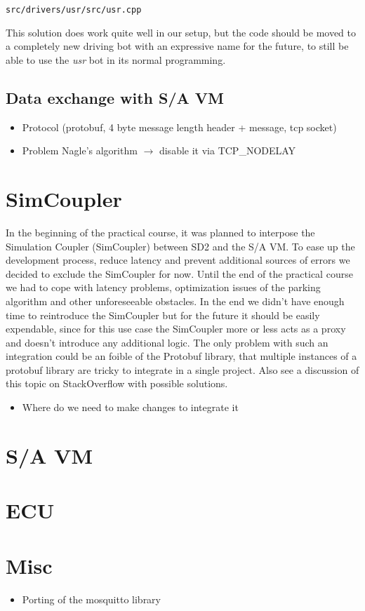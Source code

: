 \documentclass[paper=a4, fontsize=11pt]{scrreprt}
\begin{document}
\begin{listing}[ht]
  \inputminted[firstline=751,linenos=true,lastline=755,gobble=4]{c++}{../../../simulators/speed-dreams/src/drivers/usr/src/usr.cpp}
  \caption{\texttt{src/drivers/usr/src/usr.cpp}}\label{aw_parked}
\end{listing}

This solution does work quite well in our setup,
but the code should be moved to a completely new driving bot with an expressive name for the future,
to still be able to use the \textit{usr} bot in its normal programming.

\subsection{Data exchange with S/A VM}
\begin{itemize}
  \item Protocol (protobuf, 4 byte message length header + message, tcp socket)
  \item Problem Nagle's algorithm $\rightarrow$ disable it via TCP\_NODELAY
\end{itemize}
\section{SimCoupler}
In the beginning of the practical course,
it was planned to interpose the Simulation Coupler (SimCoupler) between SD2 and the S/A VM.
To ease up the development process, reduce latency and
prevent additional sources of errors we decided to exclude the SimCoupler for now.
Until the end of the practical course we had to cope with latency problems,
optimization issues of the parking algorithm and other unforeseeable obstacles.
In the end we didn't have enough time to reintroduce the SimCoupler
but for the future it should be easily expendable,
since for this use case the SimCoupler more or less acts as a proxy
and doesn't introduce any additional logic.
The only problem with such an integration could be an foible of the Protobuf library,
that multiple instances of a protobuf library are tricky to integrate in a single project.
Also see a discussion of this topic on StackOverflow \cite{soprotobuf} with possible solutions.
\begin{itemize}
  \item Where do we need to make changes to integrate it
\end{itemize}
\section{S/A VM}
\section{ECU}
\section{Misc}
\begin{itemize}
  \item Porting of the mosquitto library %
\end{itemize}


\end{document}
